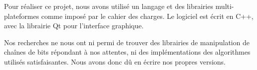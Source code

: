 Pour réaliser ce projet, nous avons utilisé un langage et des librairies multi-plateformes comme imposé par le cahier des charges. Le logiciel est écrit en C++, avec la librairie Qt pour l'interface graphique.

Nos recherches ne nous ont ni permi de trouver des librairies de manipulation de chaînes de bits répondant à nos attentes, ni des implémentations des algorithmes utilisés satisfaisantes. Nous avons donc dû en écrire nos propres versions.

